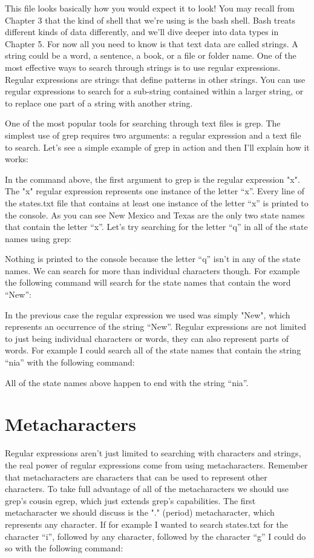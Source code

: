 This file looks basically how you would expect it to look! You may recall from Chapter 3 that the kind of shell that we’re using is the bash shell. Bash treats different kinds of data differently, and we’ll dive deeper into data types in Chapter 5. For now all you need to know is that text data are called strings. A string could be a word, a sentence, a book, or a file or folder name. One of the most effective ways to search through strings is to use regular expressions. Regular expressions are strings that define patterns in other strings. You can use regular expressions to search for a sub-string contained within a larger string, or to replace one part of a string with another string.

One of the most popular tools for searching through text files is grep. The simplest use of grep requires two arguments: a regular expression and a text file to search. Let’s see a simple example of grep in action and then I’ll explain how it works:

In the command above, the first argument to grep is the regular expression "x". The "x" regular expression represents one instance of the letter “x”. Every line of the states.txt file that contains at least one instance of the letter “x” is printed to the console. As you can see New Mexico and Texas are the only two state names that contain the letter “x”. Let’s try searching for the letter “q” in all of the state names using grep:

Nothing is printed to the console because the letter “q” isn’t in any of the state names. We can search for more than individual characters though. For example the following command will search for the state names that contain the word “New”:

In the previous case the regular expression we used was simply "New", which represents an occurrence of the string “New”. Regular expressions are not limited to just being individual characters or words, they can also represent parts of words. For example I could search all of the state names that contain the string “nia” with the following command:

All of the state names above happen to end with the string “nia”.

\section{Metacharacters}

Regular expressions aren’t just limited to searching with characters and strings, the real power of regular expressions come from using metacharacters. Remember that metacharacters are characters that can be used to represent other characters. To take full advantage of all of the metacharacters we should use grep’s cousin egrep, which just extends grep’s capabilities. The first metacharacter we should discuss is the "." (period) metacharacter, which represents any character. If for example I wanted to search states.txt for the character “i”, followed by any character, followed by the character “g” I could do so with the following command:

